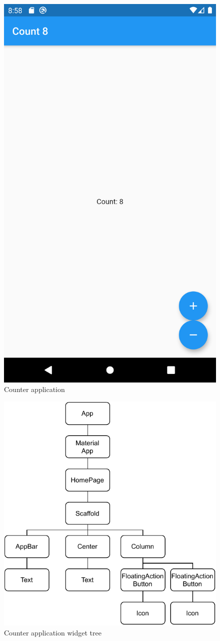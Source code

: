 \begin{figure}[htp]
    \centering
    \includegraphics[width=0.33\linewidth]{img/flutter/counter_app_base.png}
    \caption{Counter application}
    \label{fig:counter-app}
\end{figure}

\begin{figure}[htp]
    \centering
    \includegraphics[width=0.40\linewidth]{img/flutter/counter-base.pdf}
    \caption{Counter application widget tree}
    \label{fig:counter-app-widget-tree}
\end{figure}


